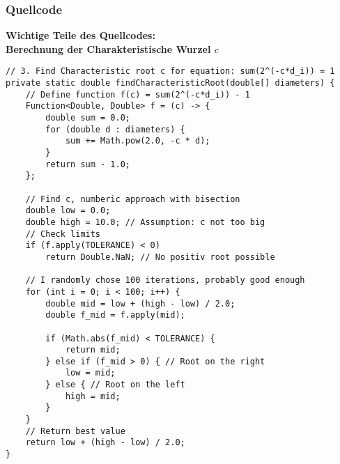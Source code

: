 \documentclass[a4paper,10pt,ngerman]{scrartcl}
\begin{document}
\subsubsection{Quellcode}
\textbf{Wichtige Teile des Quellcodes:}\\

\textbf{Berechnung der Charakteristische Wurzel $c$}
\begin{lstlisting}
// 3. Find Characteristic root c for equation: sum(2^(-c*d_i)) = 1
private static double findCharacteristicRoot(double[] diameters) {
    // Define function f(c) = sum(2^(-c*d_i)) - 1
    Function<Double, Double> f = (c) -> {
        double sum = 0.0;
        for (double d : diameters) {
            sum += Math.pow(2.0, -c * d);
        }
        return sum - 1.0;
    };

    // Find c, numberic approach with bisection
    double low = 0.0;
    double high = 10.0; // Assumption: c not too big
    // Check limits
    if (f.apply(TOLERANCE) < 0)
        return Double.NaN; // No positiv root possible

    // I randomly chose 100 iterations, probably good enough
    for (int i = 0; i < 100; i++) {
        double mid = low + (high - low) / 2.0;
        double f_mid = f.apply(mid);

        if (Math.abs(f_mid) < TOLERANCE) {
            return mid;
        } else if (f_mid > 0) { // Root on the right
            low = mid;
        } else { // Root on the left
            high = mid;
        }
    }
    // Return best value
    return low + (high - low) / 2.0;
}
\end{lstlisting}
\end{document}
